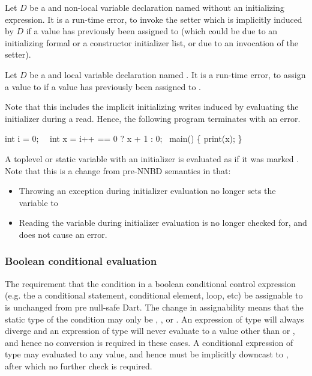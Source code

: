 \documentclass[makeidx]{article}
\begin{document}
{Let $D$ be a \LATE{} and \FINAL{} non-local variable declaration named 
without an initializing expression.
It is a run-time error, to invoke the setter  which is
implicitly induced by $D$ if a value has previously been assigned to 
(which could be due to an initializing formal or a constructor initializer
list, or due to an invocation of the setter).

Let $D$ be a \LATE{} and \FINAL{} local variable declaration named .  It is a
run-time error, to assign a value to  if a value has previously
been assigned to .

Note that this includes the implicit initializing writes induced by
evaluating the initializer during a read.  Hence, the following program
terminates with an error.

\begin{dartCode}
int i = 0;
\LATE\ \FINAL\ int x = i++ == 0 ? x + 1 : 0;
\VOID\ main() \{
  print(x);
\}
\end{dartCode}

A toplevel or static variable with an initializer is evaluated as if it
was marked \LATE.  Note that this is a change from pre-NNBD semantics in that:

\begin{itemize}
\item Throwing an exception during initializer evaluation no longer sets the
  variable to 
\item Reading the variable during initializer evaluation is no longer checked for,
  and does not cause an error.
\end{itemize}

\subsubsection{Boolean conditional evaluation}

The requirement that the condition in a boolean conditional control expression
(e.g. the a conditional statement, conditional element,  loop, etc) be
assignable to  is unchanged from pre null-safe Dart.  The change in
assignability means that the static type of the condition may only be \DYNAMIC,
, or .  An expression of type  will
always diverge and an expression of type  will never evaluate to a value
other than  or , and hence no conversion is required in these
cases.  A conditional expression of type \DYNAMIC{} may evaluated to any value,
and hence must be implicitly downcast to , after which no further check is
required.

}
\end{document}
